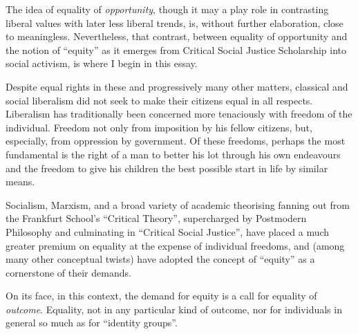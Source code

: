 \documentclass[10pt,titlepage]{article}
\begin{document}
The idea of equality of {\it opportunity}, though it may a play role in contrasting liberal values with later less liberal trends, is, without further elaboration, close to meaningless.
Nevertheless, that contrast, between equality of opportunity and the notion of ``equity'' as it emerges from Critical Social Justice Scholarship into social activism, is where I begin in this essay.

Despite equal rights in these and progressively many other matters, classical and social liberalism did not seek to make their citizens equal in all respects.
Liberalism has traditionally been concerned more tenaciously with freedom of the individual.
Freedom not only from imposition by his fellow citizens, but, especially, from oppression by government.
Of these freedoms, perhaps the most fundamental is the right of a man to better his lot through his own endeavours and the freedom to give his children the best possible start in life by similar means.

Socialism, Marxism, and a broad variety of academic theorising fanning out from the Frankfurt School's ``Critical Theory'', supercharged by Postmodern Philosophy and culminating in ``Critical Social Justice'', have placed a much greater premium on equality at the expense of individual freedoms, and (among many other conceptual twists) have adopted the concept of ``equity'' as a cornerstone of their demands.

On its face, in this context, the demand for equity is a call for equality of \emph{outcome}.
Equality, not in any particular kind of outcome, nor for individuals in general so much as for ``identity groups''.

{}








\end{document}
